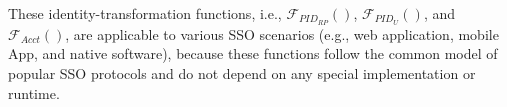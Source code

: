 
\vspace{0.4mm}
These identity-transformation functions, i.e., $\mathcal{F}_{PID_{RP}}()$, $\mathcal{F}_{PID_U}()$, and $\mathcal{F}_{Acct}()$,
    are applicable to various SSO scenarios
        (e.g., web application, mobile App, and native software),
    because these functions follow the common model of popular SSO protocols
    and do not depend on any special implementation or runtime.



